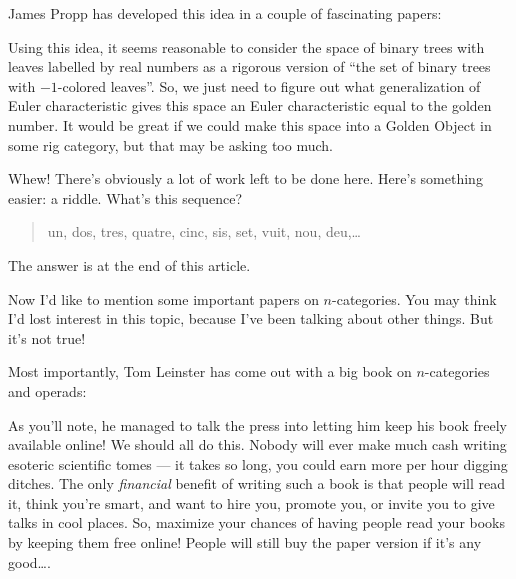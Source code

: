 \documentclass{article}
\def\tightlist{}
\renewcommand{\texttt}[1]{%
  \begingroup
  \ttfamily
  \begingroup\lccode`~=`/\lowercase{\endgroup\def~}{/\discretionary{}{}{}}%
  \begingroup\lccode`~=`[\lowercase{\endgroup\def~}{[\discretionary{}{}{}}%
  \begingroup\lccode`~=`.\lowercase{\endgroup\def~}{.\discretionary{}{}{}}%
  \catcode`/=\active\catcode`[=\active\catcode`.=\active
  \scantokens{#1\noexpand}%
  \endgroup
}
\begin{document}
James Propp has developed this idea in a couple of fascinating papers:


Using this idea, it seems reasonable to consider the space of binary
trees with leaves labelled by real numbers as a rigorous version of
``the set of binary trees with \(-1\)-colored leaves''. So, we just need
to figure out what generalization of Euler characteristic gives this
space an Euler characteristic equal to the golden number. It would be
great if we could make this space into a Golden Object in some rig
category, but that may be asking too much.

Whew! There's obviously a lot of work left to be done here. Here's
something easier: a riddle. What's this sequence?

\begin{quote}
un, dos, tres, quatre, cinc, sis, set, vuit, nou, deu,\ldots{}
\end{quote}

The answer is at the end of this article.

Now I'd like to mention some important papers on \(n\)-categories. You
may think I'd lost interest in this topic, because I've been talking
about other things. But it's not true!

Most importantly, Tom Leinster has come out with a big book on
\(n\)-categories and operads:


As you'll note, he managed to talk the press into letting him keep his
book freely available online! We should all do this. Nobody will ever
make much cash writing esoteric scientific tomes --- it takes so long,
you could earn more per hour digging ditches. The only \emph{financial}
benefit of writing such a book is that people will read it, think you're
smart, and want to hire you, promote you, or invite you to give talks in
cool places. So, maximize your chances of having people read your books
by keeping them free online! People will still buy the paper version if
it's any good\ldots.
\end{document}
